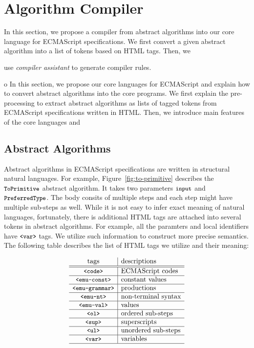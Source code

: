 \section{Algorithm Compiler}

In this section, we propose a compiler from abstract algorithms
into our core language for ECMAScript specifications.
We first convert a given abstract algorithm into a list of
tokens based on HTML tags. Then, we 

use \textit{compiler assistant}
to generate compiler rules.


o
In this section, we propose our core languages for ECMAScript
and explain how to convert abstract algorithms into the core programs.
We first explain the pre-processing to extract abstract algorithms
as lists of tagged tokens from ECMAScript specifications written in HTML.
Then, we introduce main features of the core languages and


\subsection{Abstract Algorithms}

Abstract algorithms in ECMAScript specifications are written in structural
natural languages. For example, Figure~\ref{fig:to-primitive} describes
the \( \texttt{\small ToPrimitive} \) abstract algorithm. It takes two parameters
\( \texttt{\small input} \) and \( \texttt{\small PreferredType} \). The body consits of
multiple steps and each step might have multiple sub-steps as well.
While it is not easy to infer exact meaning of natural languages,
fortunately, there is additional HTML tags are attached
into several tokens in abstract algorithms. For example, all the paramters
and local identifiers have \( \texttt{\small<var>} \) tags. We utilize such information
to construct more precise semantics. The following table describes
the list of HTML tags we utilize and their meaning:

\[
  \begin{array}{c|l}
    \text{tags} & \text{descriptions}\\\hline\hline
    \texttt{\small<code>} & \text{ECMAScript codes}\\\hline
    \texttt{\small<emu-const>} & \text{constant values}\\\hline
    \texttt{\small<emu-grammar>} & \text{productions}\\\hline
    \texttt{\small<emu-nt>} & \text{non-terminal syntax}\\\hline
    \texttt{\small<emu-val>} & \text{values}\\\hline
    \texttt{\small<ol>} & \text{ordered sub-steps}\\\hline
    \texttt{\small<sup>} & \text{superscripts}\\\hline
    \texttt{\small<ul>} & \text{unordered sub-steps}\\\hline
    \texttt{\small<var>} & \text{variables}\\\hline
  \end{array}
\]

